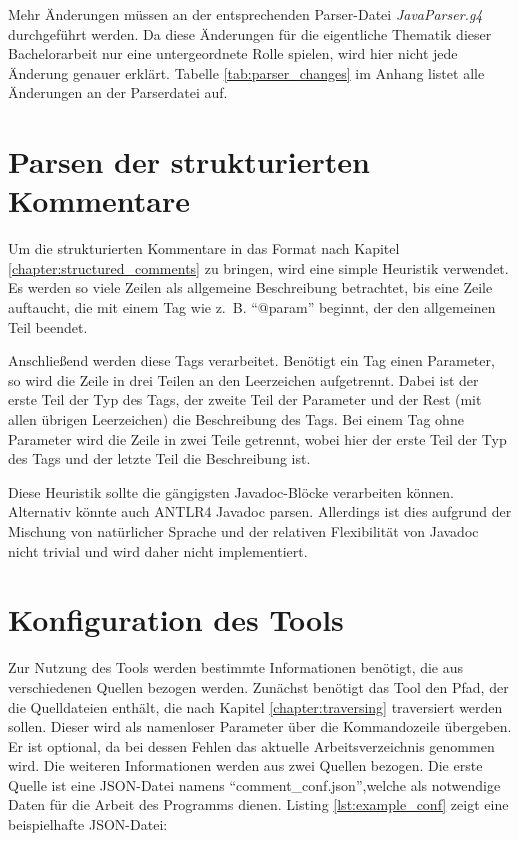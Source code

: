 Mehr Änderungen müssen an der entsprechenden Parser-Datei \textit{JavaParser.g4} durchgeführt werden.  Da diese Änderungen für die eigentliche Thematik dieser Bachelorarbeit nur eine untergeordnete Rolle spielen, wird hier nicht jede Änderung genauer erklärt. Tabelle \ref{tab:parser_changes} im Anhang listet alle Änderungen an der Parserdatei auf. 
\section{Parsen der strukturierten Kommentare}
Um die strukturierten Kommentare in das Format nach Kapitel \ref{chapter:structured_comments} zu bringen, wird eine simple Heuristik verwendet. Es werden so viele Zeilen als allgemeine Beschreibung betrachtet, bis eine Zeile auftaucht, die mit einem Tag wie z.~B. \enquote{@param} beginnt, der den allgemeinen Teil beendet.

Anschließend werden diese Tags verarbeitet. Benötigt ein Tag einen Parameter, so wird die Zeile in drei Teilen an den Leerzeichen aufgetrennt. Dabei ist der erste Teil der Typ des Tags, der zweite Teil der Parameter und der Rest (mit allen übrigen Leerzeichen) die Beschreibung des Tags.
Bei einem Tag ohne Parameter wird die Zeile in zwei Teile getrennt, wobei hier der erste Teil der Typ des Tags und der letzte Teil die Beschreibung ist.

Diese Heuristik sollte die gängigsten Javadoc-Blöcke verarbeiten können. Alternativ könnte auch ANTLR4 Javadoc parsen. Allerdings ist dies aufgrund der Mischung von natürlicher Sprache und der relativen Flexibilität von Javadoc nicht trivial und wird daher nicht implementiert. 



\section{Konfiguration des Tools}\label{chapter:conf}
Zur Nutzung des Tools werden bestimmte Informationen benötigt, die aus verschiedenen Quellen bezogen werden. Zunächst benötigt das Tool den Pfad, der die Quelldateien enthält, die nach Kapitel \ref{chapter:traversing} traversiert werden sollen. Dieser wird als namenloser Parameter über die Kommandozeile übergeben. Er ist optional, da bei dessen Fehlen das aktuelle Arbeitsverzeichnis genommen wird. Die weiteren Informationen werden aus zwei Quellen bezogen. Die erste Quelle ist eine \ac{JSON}-Datei namens \enquote{comment\_conf.json},welche als notwendige Daten für die Arbeit des Programms dienen. Listing \ref{lst:example_conf} zeigt eine beispielhafte \ac{JSON}-Datei:

